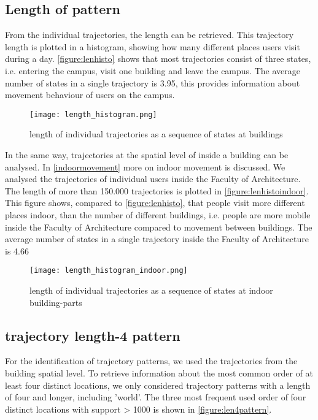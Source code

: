 \subsection{Length of pattern}
From the individual trajectories, the length can be retrieved. This trajectory length is plotted in a histogram, showing how many different places users visit during a day. \autoref{figure:lenhisto} shows that most trajectories consist of three states, i.e. entering the campus, visit one building and leave the campus. The average number of states in a single trajectory is 3.95, this provides information about movement behaviour of users on the campus. 

\begin{figure}[H]
\centering
\texttt{[image: length\_histogram.png]}
\captionsetup{justification=centering}
\caption{length of individual trajectories as a sequence of states at buildings}
\label{figure:lenhisto}
\end{figure}
In the same way, trajectories at the spatial level of inside a building can be analysed. In \autoref{indoormovement} more on indoor movement is discussed. We analysed the trajectories of individual users inside the Faculty of Architecture. The length of more than 150.000 trajectories is plotted in \autoref{figure:lenhistoindoor}. This figure shows, compared to \autoref{figure:lenhisto}, that people visit more different places indoor, than the number of different buildings, i.e. people are more mobile inside the Faculty of Architecture compared to movement between buildings. The average number of states in a single trajectory inside the Faculty of Architecture is 4.66

\begin{figure}[H]
\centering
\texttt{[image: length\_histogram\_indoor.png]}
\captionsetup{justification=centering}
\caption{length of individual trajectories as a sequence of states at indoor building-parts}
\label{figure:lenhistoindoor}
\end{figure}

\subsection{trajectory length-4 pattern}
For the identification of trajectory patterns, we used the trajectories from the building spatial level. To retrieve information about the most common order of at least four distinct locations, we only considered trajectory patterns with a length of four and longer, including 'world'. The three most frequent used order of four distinct locations with support > 1000 is shown in \autoref{figure:len4pattern}.

